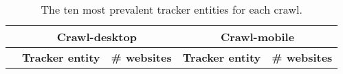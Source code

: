 \begin{table}[ht] 
\caption{The ten most prevalent tracker entities for each crawl.} 
\centering 
\begin{tabular}{|l|ll|ll|} 
\hline\textbf{} & \multicolumn{2}{c|}{\textbf{Crawl-desktop}} & \multicolumn{2}{c|}{\textbf{Crawl-mobile}} \\ \hline 
& \multicolumn{1}{r|}{\textbf{Tracker entity}} & \textbf{\# websites} & \multicolumn{1}{l|}{\textbf{Tracker entity}} & \textbf{\# websites} \\ \hline 
\end{tabular} 
\label{tab:TrackerEntityTop10} 
\end{table}